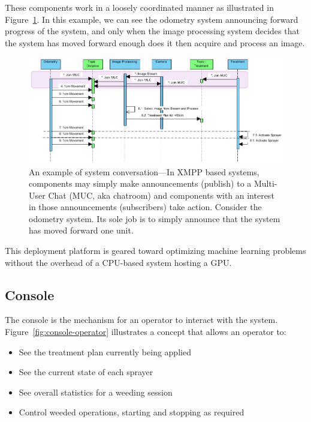 \documentclass[12pt]{article}
\begin{document}
{These components work in a loosely coordinated manner as illustrated in Figure~\ref{fig:uml-system}. In this example, we can see the odometry system announcing forward progress of the system, and only when the image processing system decides that the system has moved forward enough does it then acquire and process an image.

\begin{figure}[H]
	\centering
	\includegraphics[width=0.75\linewidth]{./figures/uml-system-example.jpg}
	\caption[An example of system conversations]{An example of system conversation---In XMPP based systems, components may simply make announcements (publish) to a Multi-User Chat (MUC, aka chatroom) and components with an interest in those announcements (subscribers) take action. Consider the odometry system. Its sole job is to simply announce that the system has moved forward one unit.}
	\label{fig:uml-system}
\end{figure}

This deployment platform is geared toward optimizing machine learning problems without the overhead of a CPU-based system hosting a GPU.
 
\subsection{Console}
The console is the mechanism for an operator to interact with the system. Figure~\ref{fig:console-operator} illustrates a concept that allows an operator to:
\begin{itemize}
	\item{See the treatment plan currently being applied}
	\item{See the current state of each sprayer}
	\item{See overall statistics for a weeding session}
	\item{Control weeded operations, starting and stopping as required}
\end{itemize}
	

}
\end{document}
